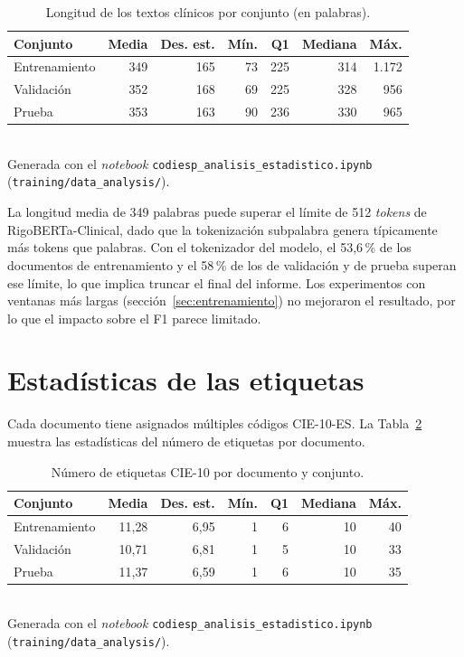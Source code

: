 \begin{table}[h]
\centering
\caption{Longitud de los textos clínicos por conjunto (en palabras).}
\label{tab:text-stats}
\begin{tabular}{lrrrrrr}
\hline
\textbf{Conjunto} & \textbf{Media} & \textbf{Des. est.} & \textbf{Mín.} & \textbf{Q1} & \textbf{Mediana} & \textbf{Máx.} \\
\hline
Entrenamiento & 349 & 165 & 73 & 225 & 314 & 1.172 \\
Validación & 352 & 168 & 69 & 225 & 328 & 956 \\
Prueba & 353 & 163 & 90 & 236 & 330 & 965 \\
\hline
\end{tabular}
\\[4pt]
{\footnotesize Generada con el \emph{notebook} \texttt{codiesp\_\allowbreak{}analisis\_\allowbreak{}estadistico.ipynb} (\texttt{training/\allowbreak{}data\_analysis/}).}
\end{table}

La longitud media de 349 palabras puede superar el límite de 512 \emph{tokens} de RigoBERTa-Clinical, dado que la tokenización subpalabra genera típicamente más tokens que palabras. Con el tokenizador del modelo, el 53,6\,\% de los documentos de entrenamiento y el 58\,\% de los de validación y de prueba superan ese límite, lo que implica truncar el final del informe. Los experimentos con ventanas más largas (sección~\ref{sec:entrenamiento}) no mejoraron el resultado, por lo que el impacto sobre el F1 parece limitado.

\section{Estadísticas de las etiquetas}

Cada documento tiene asignados múltiples códigos CIE-10-ES. La Tabla~\ref{tab:label-stats} muestra las estadísticas del número de etiquetas por documento.

\begin{table}[h]
\centering
\caption{Número de etiquetas CIE-10 por documento y conjunto.}
\label{tab:label-stats}
\begin{tabular}{lrrrrrr}
\hline
\textbf{Conjunto} & \textbf{Media} & \textbf{Des. est.} & \textbf{Mín.} & \textbf{Q1} & \textbf{Mediana} & \textbf{Máx.} \\
\hline
Entrenamiento & 11{,}28 & 6{,}95 & 1 & 6 & 10 & 40 \\
Validación & 10{,}71 & 6{,}81 & 1 & 5 & 10 & 33 \\
Prueba & 11{,}37 & 6{,}59 & 1 & 6 & 10 & 35 \\
\hline
\end{tabular}
\\[4pt]
{\footnotesize Generada con el \emph{notebook} \texttt{codiesp\_\allowbreak{}analisis\_\allowbreak{}estadistico.ipynb} (\texttt{training/\allowbreak{}data\_analysis/}).}
\end{table}

